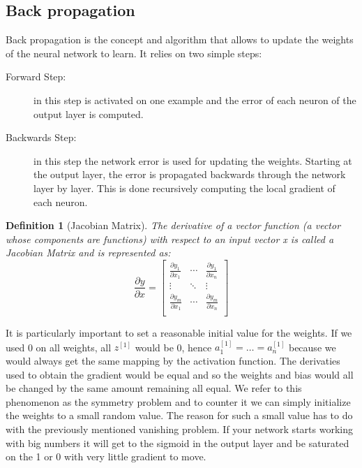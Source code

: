 \documentclass{article}
\newtheorem{definition}{Definition}[section]
\begin{document}
\subsection{Back propagation}
Back propagation is the concept and algorithm that allows to update the weights of the neural network to learn. It relies on two simple steps:
\begin{description}
    \item[Forward Step:] in this step is activated on one example and the error of each neuron of the output layer is computed.
    \item[Backwards Step:] in this step the network error is used for updating the weights. Starting at the output layer, the error is propagated backwards through the network layer by layer. This is done recursively computing the local gradient of each neuron.  
\end{description}
\begin{definition}[Jacobian Matrix]
    The derivative of a vector function (a vector whose components are functions) with respect to an input vector x is called a Jacobian Matrix and is represented as:
    \[ 
        \frac{\partial y}{\partial x}=
        \begin{bmatrix}
            \frac{\partial y_1}{\partial x_1} & \cdots & \frac{\partial y_1}{\partial x_n} \\
            \vdots & \ddots & \vdots \\
            \frac{\partial y_m}{\partial x_1} & \cdots & \frac{\partial y_m}{\partial x_n} \\
        \end{bmatrix}
    \]
    
\end{definition}
It is particularly important to set a reasonable initial value for the weights. If we used 0 on all weights, all $ z^{[1]} $ would be 0, hence $ a^{[1]}_1 = \ldots =a^{[1]}_n $ because we would always get the same mapping by the activation function. The derivaties used to obtain the gradient would be equal and so the weights and bias would all be changed by the same amount remaining all equal. We refer to this phenomenon as the symmetry problem and to counter it we can simply initialize the weights to a small random value. The reason for such a small value has to do with the previously mentioned vanishing problem. If your network starts working with big numbers it will get to the sigmoid in the output layer and be saturated on the 1 or 0 with very little gradient to move.
\end{document}
